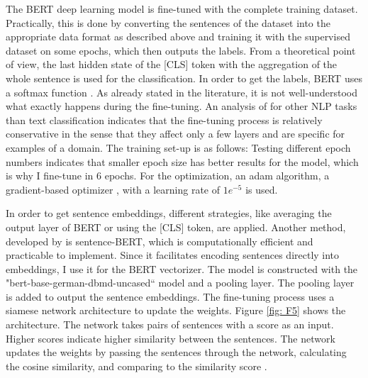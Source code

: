 \documentclass[12pt, a4paper, titlepage]{article}
\begin{document}
The \ac{BERT} deep learning model is fine-tuned with the complete training dataset. Practically, this is done by converting the sentences of the dataset into the appropriate data format as described above and training it with the supervised dataset on some epochs, which then outputs the labels. From a theoretical point of view, the last hidden state of the [CLS] token with the aggregation of the whole sentence is used for the classification. In order to get the labels, \ac{BERT} uses a softmax function \citep{sun2019}. As already stated in the literature, it is not well-understood what exactly happens during the fine-tuning. An analysis of \citet{merchant2020} for other \ac{NLP} tasks than text classification indicates that the fine-tuning process is relatively conservative in the sense that they affect only a few layers and are specific for examples of a domain. The training set-up is as follows: Testing different epoch numbers indicates that smaller epoch size has better results for the model, which is why I fine-tune in 6 epochs. For the optimization, an adam algorithm, a gradient-based optimizer \citep{kingma2014}, with a learning rate of $1e^{-5}$ is used. 

In order to get sentence embeddings, different strategies, like averaging the output layer of \ac{BERT} or using the [CLS] token, are applied. Another method, developed by \citet{reimers2019} is sentence-\ac{BERT}, which is computationally efficient and practicable to implement. Since it facilitates encoding sentences directly into embeddings, I use it for the \ac{BERT} vectorizer. The model is constructed with the "bert-base-german-dbmd-uncased`` model and a pooling layer. The pooling layer is added to output the sentence embeddings. The fine-tuning process uses a siamese network architecture to update the weights. Figure \ref{fig: F5} shows the architecture. The network takes pairs of sentences with a score as an input. Higher scores indicate higher similarity between the sentences. The network updates the weights by passing the sentences through the network, calculating the cosine similarity, and comparing to the similarity score \citep{reimers2019}.
\end{document}
